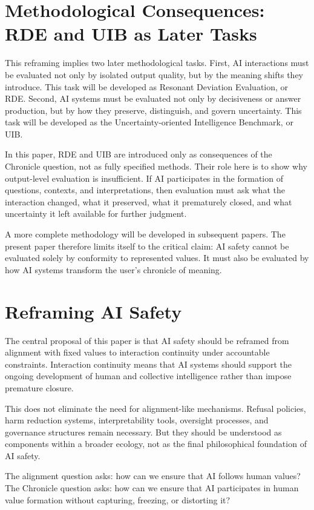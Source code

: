 \documentclass[11pt,a4paper]{article}
\begin{document}
\section{Methodological Consequences: RDE and UIB as Later Tasks}

This reframing implies two later methodological tasks. First, AI interactions must be evaluated not only by isolated output quality, but by the meaning shifts they introduce. This task will be developed as Resonant Deviation Evaluation, or RDE. Second, AI systems must be evaluated not only by decisiveness or answer production, but by how they preserve, distinguish, and govern uncertainty. This task will be developed as the Uncertainty-oriented Intelligence Benchmark, or UIB.

In this paper, RDE and UIB are introduced only as consequences of the Chronicle question, not as fully specified methods. Their role here is to show why output-level evaluation is insufficient. If AI participates in the formation of questions, contexts, and interpretations, then evaluation must ask what the interaction changed, what it preserved, what it prematurely closed, and what uncertainty it left available for further judgment.

A more complete methodology will be developed in subsequent papers. The present paper therefore limits itself to the critical claim: AI safety cannot be evaluated solely by conformity to represented values. It must also be evaluated by how AI systems transform the user's chronicle of meaning.

\section{Reframing AI Safety}

The central proposal of this paper is that AI safety should be reframed from alignment with fixed values to interaction continuity under accountable constraints. Interaction continuity means that AI systems should support the ongoing development of human and collective intelligence rather than impose premature closure.

This does not eliminate the need for alignment-like mechanisms. Refusal policies, harm reduction systems, interpretability tools, oversight processes, and governance structures remain necessary. But they should be understood as components within a broader ecology, not as the final philosophical foundation of AI safety.

The alignment question asks: how can we ensure that AI follows human values? The Chronicle question asks: how can we ensure that AI participates in human value formation without capturing, freezing, or distorting it?
\end{document}
